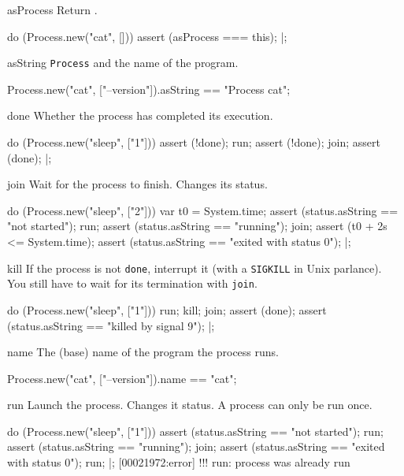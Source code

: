 \begin{urbiscriptapi}
\item[asProcess] Return \this.
\begin{urbiscript}
do (Process.new("cat", []))
{
  assert (asProcess === this);
}|;
\end{urbiscript}


\item[asString] \lstinline|Process| and the name of the program.
\begin{urbiassert}
Process.new("cat", ["--version"]).asString
  == "Process cat";
\end{urbiassert}


\item[done] Whether the process has completed its execution.
\begin{urbiscript}
do (Process.new("sleep", ["1"]))
{
  assert (!done);
  run;
  assert (!done);
  join;
  assert (done);
}|;
\end{urbiscript}


\item[join] Wait for the process to finish.  Changes its status.
\begin{urbiscript}
do (Process.new("sleep", ["2"]))
{
  var t0 = System.time;
  assert (status.asString == "not started");
  run;
  assert (status.asString == "running");
  join;
  assert (t0 + 2s <= System.time);
  assert (status.asString == "exited with status 0");
}|;
\end{urbiscript}


\item[kill] If the process is not \lstinline|done|, interrupt it (with
  a \lstinline|SIGKILL| in Unix parlance).  You still have to wait for
  its termination with \lstinline|join|.
\begin{urbiscript}
do (Process.new("sleep", ["1"]))
{
  run;
  kill;
  join;
  assert (done);
  assert (status.asString == "killed by signal 9");
}|;
\end{urbiscript}


\item[name] The (base) name of the program the process runs.
\begin{urbiassert}
Process.new("cat", ["--version"]).name == "cat";
\end{urbiassert}


\item[run] Launch the process.  Changes it status.  A process can only
  be run once.
\begin{urbiscript}
do (Process.new("sleep", ["1"]))
{
  assert (status.asString == "not started");
  run;
  assert (status.asString == "running");
  join;
  assert (status.asString == "exited with status 0");
  run;
}|;
[00021972:error] !!! run: process was already run
\end{urbiscript}



\end{urbiscriptapi}
